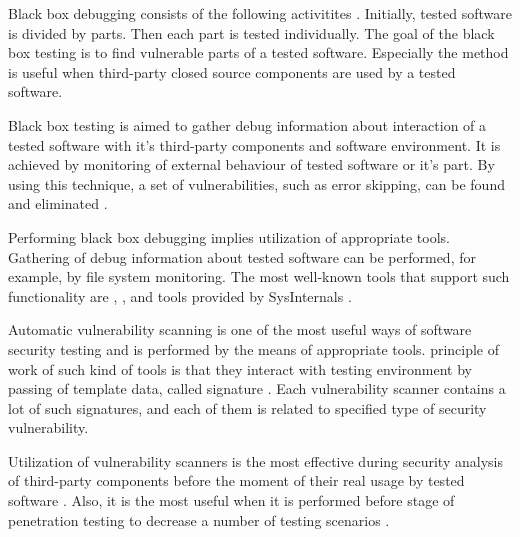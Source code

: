 

%
Black box debugging consists of the following activitites .
%
Initially, tested software is divided by parts. 
%
Then each part is tested individually. 
%
The goal of the black box testing is to find vulnerable parts of a tested software. 
%
Especially the method is useful when third-party closed source components are used by a tested software. 

%
Black box testing is aimed to gather debug information about interaction of a tested software with it's third-party components and software environment. 
%
It is achieved by monitoring of external behaviour of tested software or it's part. 
%
By using this technique, a set of vulnerabilities, such as error skipping, can be found and eliminated . 

%
Performing black box debugging implies utilization of appropriate tools. 
%
Gathering of debug information about tested software can be performed, for example, by file system monitoring. 
%
The most well-known tools that support such functionality are  ,  , and tools provided by SysInternals . 



Automatic vulnerability scanning is one of the most useful ways of software security testing and is performed by the means of appropriate tools. 
%
\The principle of work of such kind of tools is that they interact with testing environment by passing of template data, called signature . 
%
Each vulnerability scanner contains a lot of such signatures, and each of them is related to specified type of security vulnerability. 

%
Utilization of vulnerability scanners is the most effective during security analysis of third-party components before the moment of their real usage by tested software . 
%
Also, it is the most useful when it is performed before stage of penetration testing to decrease a number of testing scenarios . 

